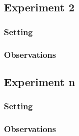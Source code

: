 \documentclass[11pt]{article}
\begin{document}
\subsection{Experiment 2}

\subsubsection{Setting}

\subsubsection{Observations}

\subsection{Experiment n}

\subsubsection{Setting}

\subsubsection{Observations}
\end{document}
